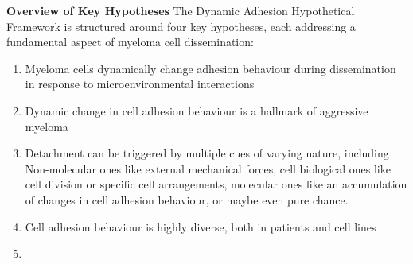 \textbf{Overview of Key Hypotheses}
The Dynamic Adhesion Hypothetical Framework is structured around four key
hypotheses, each addressing a fundamental aspect of myeloma cell dissemination:
\begin{enumerate}
      \item Myeloma cells dynamically change adhesion behaviour during
            dissemination in response to microenvironmental interactions
      \item Dynamic change in cell adhesion behaviour is a hallmark of
            aggressive myeloma
      \item Detachment can be triggered by multiple cues of varying nature,
            including Non-molecular ones like external mechanical forces, cell
            biological ones like cell division or specific cell arrangements,
            molecular ones like an accumulation of changes in cell adhesion
            behaviour, or maybe even pure chance.


      \item Cell adhesion behaviour is highly diverse, both in patients and cell
            lines

      \item
\end{enumerate}

